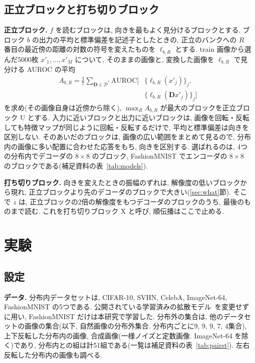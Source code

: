\documentclass[MIRU,submit]{miru2025j}
\newcommand{\Dm}{\mathbf{D}}            %
\begin{document}
\subsection{正立ブロックと打ち切りブロック}
\label{sec:blocks}
\textbf{正立ブロック.} $f$ を読むブロックは, 向きを最もよく見分けるブロックとする. ブロック $b$ の出力の平均と標準偏差を記述子としたときの, 正立のバンクへの $R$ 番目の最近傍の距離の対数の符号を変えたものを $\ell_{b,R}$ とする. train 画像から選んだ5000枚 $x'_1,\ldots,x'_M$ について, そのままの画像と, 変換した画像を $\ell_{b,R}$ で見分ける AUROC の平均
\begin{equation}
\begin{split}
A_{b,R}=\frac{1}{7}\sum_{\Dm\in\mathcal{D}^{*}}\mathrm{AUROC}\bigl[&\{\ell_{b,R}(x'_j)\}_{j},\\
&\{\ell_{b,R}(\Dm x'_j)\}_{j}\bigr]
\end{split}
\label{eq:A}
\end{equation}
を求め(その画像自身は近傍から除く), $\max_R A_{b,R}$ が最大のブロックを正立ブロック U とする. 入力に近いブロックと出力に近いブロックは, 画像を回転・反転しても特徴マップが同じように回転・反転するだけで, 平均と標準偏差は向きを区別しない. そのあいだのブロックは, 画像の広い範囲をまとめて見るので, 分布内の画像に多い配置に合わせた応答をもち, 向きを区別する. 選ばれるのは, 4つの分布内でデコーダの $8{\times}8$ のブロック, FashionMNIST でエンコーダの $8{\times}8$ のブロックである(補足資料の表~\ref{tab:models}).

\textbf{打ち切りブロック.} 向きを変えたときの振幅のずれは, 解像度の低いブロックから現れ, 正立ブロックより先のデコーダのブロックで大きい(\ref{sec:what}節). そこで $z$ は, 正立ブロックの2倍の解像度をもつデコーダのブロックのうち, 最後のものまで読む. これを打ち切りブロック X と呼び, 順伝播はここで止める.

\section{実験}
\subsection{設定}
\textbf{データ.} 分布内データセットは, CIFAR-10, SVHN, CelebA, ImageNet-64, FashionMNIST の5つである. 公開されている学習済みの拡散モデル~\cite{karras2022edm,kamkari2024geometric,nichol2021improved,karras2024edm2}を変更せずに用い, FashionMNIST だけは本研究で学習した. 分布外の集合は, 他のデータセットの画像の集合(以下, 自然画像の分布外集合. 分布内ごとに9, 9, 9, 7, 4集合), 上下反転した分布内の画像, 合成画像(一様ノイズと定数画像. ImageNet-64 を除く)であり, 分布内との組は計51組である(一覧は補足資料の表~\ref{tab:pairst}). 左右反転した分布内の画像も調べる.
\end{document}
